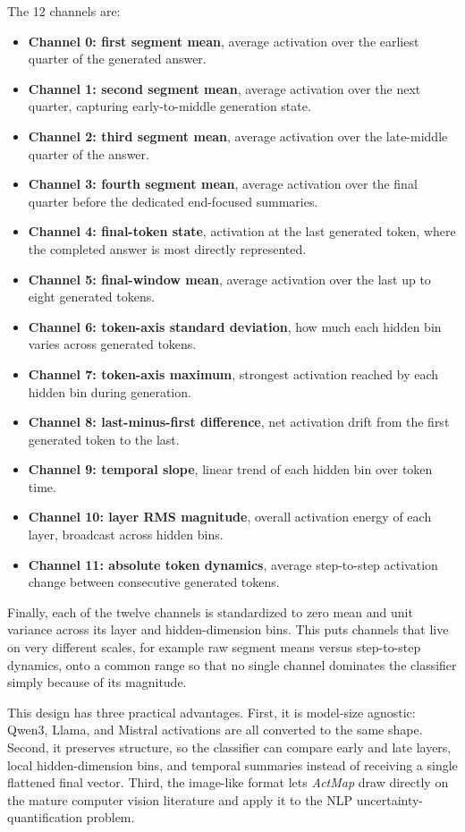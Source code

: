 \documentclass{article}
\newcommand{\actmap}{\textit{ActMap}}
\begin{document}
The 12 channels are:
\begin{itemize}
    \item \textbf{Channel 0: first segment mean}, average activation over the earliest quarter of the generated answer.
    \item \textbf{Channel 1: second segment mean}, average activation over the next quarter, capturing early-to-middle generation state.
    \item \textbf{Channel 2: third segment mean}, average activation over the late-middle quarter of the answer.
    \item \textbf{Channel 3: fourth segment mean}, average activation over the final quarter before the dedicated end-focused summaries.
    \item \textbf{Channel 4: final-token state}, activation at the last generated token, where the completed answer is most directly represented.
    \item \textbf{Channel 5: final-window mean}, average activation over the last up to eight generated tokens.
    \item \textbf{Channel 6: token-axis standard deviation}, how much each hidden bin varies across generated tokens.
    \item \textbf{Channel 7: token-axis maximum}, strongest activation reached by each hidden bin during generation.
    \item \textbf{Channel 8: last-minus-first difference}, net activation drift from the first generated token to the last.
    \item \textbf{Channel 9: temporal slope}, linear trend of each hidden bin over token time.
    \item \textbf{Channel 10: layer RMS magnitude}, overall activation energy of each layer, broadcast across hidden bins.
    \item \textbf{Channel 11: absolute token dynamics}, average step-to-step activation change between consecutive generated tokens.
\end{itemize}

Finally, each of the twelve channels is standardized to zero mean and unit variance across its layer and hidden-dimension bins. This puts channels that live on very different scales, for example raw segment means versus step-to-step dynamics, onto a common range so that no single channel dominates the classifier simply because of its magnitude.

This design has three practical advantages. First, it is model-size agnostic: Qwen3, Llama, and Mistral activations are all converted to the same shape. Second, it preserves structure, so the classifier can compare early and late layers, local hidden-dimension bins, and temporal summaries instead of receiving a single flattened final vector. Third, the image-like format lets \actmap{} draw directly on the mature computer vision literature and apply it to the NLP uncertainty-quantification problem.
\end{document}

